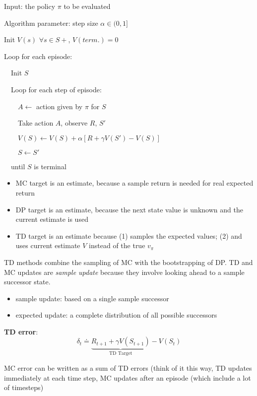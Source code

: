\documentclass[sutton_barto_notes.tex]{subfiles}
\begin{document}
\begin{tcolorbox}[width=1.1\textwidth,title={Tabular TD(0) for estimating $v_\pi$}]
Input: the policy $\pi$ to be evaluated

Algorithm parameter: step size $\alpha \in (0, 1]$

Init $V(s)$ $\forall s \in S+$, $V(term.) = 0$

Loop for each episode:

$\quad$Init $S$

$\quad$Loop for each step of episode:

$\quad\quad A \leftarrow$ action given by $\pi$ for $S$

$\quad\quad$Take action $A$, observe $R$, $S'$

$\quad\quad V(S) \leftarrow V(S) + \alpha[R + \gamma V(S') - V(S)]$

$\quad\quad S \leftarrow S'$

$\quad$until $S$ is terminal
\end{tcolorbox}

\begin{itemize}
\item MC target is an estimate, because a sample return is needed for real expected return
\item DP target is an estimate, because the next state value is unknown and the current estimate is used
\item TD target is an estimate because (1) samples the expected values; (2) and uses current estimate $V$ instead of the true $v_\pi$
\end{itemize}

TD methods combine the sampling of MC with the bootstrapping of DP.
TD and MC updates are \textit{sample update} because they involve looking ahead to a sample successor state.

\begin{itemize}
\item sample update: based on a single sample successor
\item expected update: a complete distribution of all possible successors
\end{itemize}

\begin{definition}
\textbf{TD error}:
$$\delta_t \doteq \underbrace{R_{t+1} + \gamma V(S_{t+1})}_\text{TD Target} - V(S_t)$$
\end{definition}

MC error can be written as a sum of TD errors (think of it this way, TD updates immediately at each time step, MC updates after an episode (which include a lot of timesteps)
\end{document}
